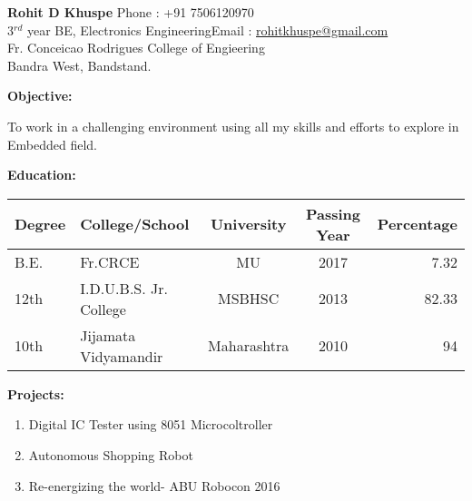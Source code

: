 \documentclass[a4paper]{article}
\begin{document}
	\begin{flushleft}
		\textbf{Rohit D Khuspe} \hfill{Phone : +91 7506120970}\\
		3$^{rd}$ year BE, Electronics Engineering\hfill{Email : \underline{rohitkhuspe@gmail.com}}\\
		Fr. Conceicao Rodrigues College of Engieering\\
		Bandra West, Bandstand.\\ %
		
			
	\end{flushleft}
	
	\vspace{-3mm}
 \begin{flushleft}
 	\begin{Large}\textbf{Objective:}\end{Large} \hspace{0.05in} To work in a challenging environment using all my skills and efforts to explore in Embedded field.\\
 	\begin{Large}\vspace{0.3in}\textbf{Education:}\end{Large}
 	\vspace{-3mm}
 	\begin{center}
 	\begin{tabular}{|l|l|c|c|r|}
 	\hline
 	Degree & College/School & University & Passing Year & Percentage\\ \hline
 
 	B.E. & Fr.CRCE & MU & 2017 & 7.32\\ \hline
 
 	12th & I.D.U.B.S. Jr. College & MSBHSC & 2013 & 82.33\\ \hline
 
	10th & Jijamata Vidyamandir & Maharashtra & 2010 & 94\\ \hline

 	\end{tabular}
    \end{center}
  	\begin{Large}\vspace{0.2in}\textbf{Projects:}\end{Large}
  	\begin{enumerate}
  		\item Digital IC Tester using 8051 Microcoltroller
  		\item Autonomous Shopping Robot
  		\item Re-energizing the world- ABU Robocon 2016
  	\end{enumerate}
    	
  	
 	
 	
 	
 \end{flushleft}

	

	
\end{document}
